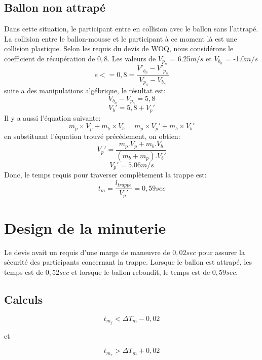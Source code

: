 \documentclass[12pt]{article}
\begin{document}
\subsection{Ballon non attrapé}
Dans cette situation, le participant entre en collision avec le ballon sans l'attrapé. La collision entre le ballon-mousse et le participant à ce moment là est une collision plastique. Selon les requis du devis de WOQ, nous considérons le coefficient de récupération de $0,8$. Les valeurs de $V_{p_n}$ = 6.25$m/s$ et $V_{b_n}$ = -1.0$m/s$
\begin{equation}
e <= 0,8 = \frac{V'_{b_n} - V'_{p_n}}{V_{p_n} - V_{b_n}}
\end{equation}
suite a des manipulations algébrique, le résultat est:
\begin{equation}
{V_{b_n} - V_{p_n}} = 5,8
\end{equation}
\begin{equation}
V_b' = 5,8 + V_p'
\end{equation}
Il y a aussi l'équation suivante:
\begin{equation}
m_p\times V_p + m_b\times V_b = m_p\times V_p' + m_b\times V_b'
\end{equation}
\noindent
en substituant l'équation trouvé précédement, on obtien:
\begin{equation}
V_p' = \frac{m_p.V_p + m_b.V_b}{(m_b + m_p).V_b'}
\end{equation}
\begin{equation}
V_p' = 5.06m/s
\end{equation}
Donc, le temps requis pour traverser complètement la trappe est:
\begin{equation}
t_m = \frac{l_{trappe}}{V_p'} = 0,59 sec
\end{equation}

\section{Design de la minuterie}
Le devis avait un requis d'une marge de maneuvre de $0,02sec$ pour assurer la sécurité des participants concernant la trappe. Lorsque le ballon est attrapé, les temps est de $0,52sec$ et lorsque le ballon rebondit, le temps est de $0,59sec$.
\subsection{Calculs}
\begin{equation}
t_{m_f} < \Delta T_m - 0,02
\end{equation}
\begin{center}
et
\end{center}
\begin{equation}
t_{m_r} > \Delta T_m + 0,02
\end{equation}
\end{document}
